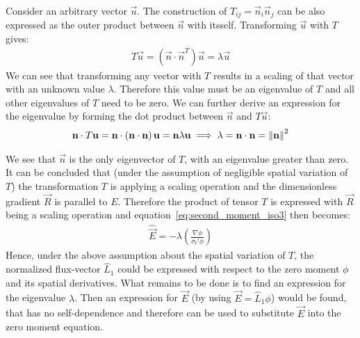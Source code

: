 Consider an arbitrary vector $\vec{u}$. The construction of $T_{ij}=\vec{n}_i\vec{n}_j$ can be also expressed as the outer product between $\vec{n}$ with itsself. Transforming $\vec{u}$ with $T$ gives:
\begin{align}
T\vec{u} = \left(\vec{n}\cdot\vec{n}^T\right)\vec{u} = \lambda\vec{u}
\end{align}
We can see that transforming any vector with $T$ results in a scaling of that vector with an unknown value $\lambda$. Therefore this value must be an eigenvalue of $T$ and all other eigenvalues of $T$ need to be zero. We can further derive an expression for the eigenvalue by forming the dot product between $\vec{n}$ and $T\vec{u}$:
\begin{align}
\boldsymbol{\mathbf{n}}\cdot T\boldsymbol{\mathbf{u}} = \boldsymbol{\mathbf{n}}\cdot\left(\boldsymbol{\mathbf{n}}\cdot\boldsymbol{\mathbf{n}}\right)\boldsymbol{\mathbf{u}} = \boldsymbol{\mathbf{n}}\lambda\boldsymbol{\mathbf{u}} \implies \lambda=\boldsymbol{\mathbf{n}}\cdot\boldsymbol{\mathbf{n}}=\left\lVert\boldsymbol{\mathbf{n}}\right\rVert^2
\end{align}

We see that $\vec{n}$ is the only eigenvector of $T$, with an eigenvalue greater than zero. It can be concluded that (under the assumption of negligible spatial variation of $T$) the transformation $T$ is applying a scaling operation and the dimensionless gradient $\vec{R}$ is parallel to $E$. Therefore the product of tensor $T$ is expressed with $\vec{R}$ being a scaling operation and equation~\ref{eq:second_moment_iso3} then becomes:
\begin{align}
\widehat{\vec{E}} = -\lambda\left(\frac{\nabla\phi}{\sigma_t'\phi}\right )
\label{eq:second_moment_iso4}
\end{align}
Hence, under the above assumption about the spatial variation of $T$, the normalized flux-vector $\hat{L}_1$ could be expressed with respect to the zero moment $\phi$ and its spatial derivatives. What remains to be done is to find an expression for the eigenvalue $\lambda$. Then an expression for $\vec{E}$ (by using $\vec{E}=\hat{L}_1\phi$) would be found, that has no self-dependence and therefore can be used to substitute $\vec{E}$ into the zero moment equation.

